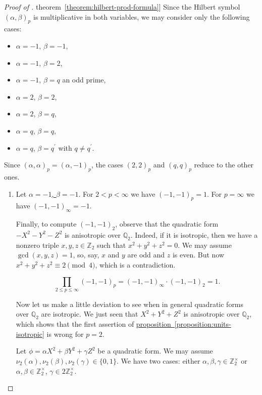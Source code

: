 \documentclass{article}
\newcommand{\ZZ}{\mathbb{Z}}
\newcommand{\QQ}{\mathbb{Q}}
\newcommand{\refref}[2]{\hyperref[#2]{#1~\ref*{#2}}}
\theoremstyle{myplain}
\theoremstyle{mydefinition}
\begin{document}
\begin{proof}[Proof of \refref{theorem}{theorem:hilbert-prod-formula}]
  Since the Hilbert symbol $(\alpha,\beta)_p$ is multiplicative in both
  variables, we may consider only the following cases:
  \begin{itemize}
  \item $\alpha = -1$, $\beta = -1$,
  \item $\alpha = -1$, $\beta = 2$,
  \item $\alpha = -1$, $\beta = q$ an odd prime,
  \item $\alpha = 2$, $\beta = 2$,
  \item $\alpha = 2$, $\beta = q$,
  \item $\alpha = q$, $\beta = q$,
  \item $\alpha = q$, $\beta = q^\prime$ with $q \ne q^\prime$.
  \end{itemize}

  Since $(\alpha,\alpha)_p = (\alpha,-1)_p$, the cases $(2,2)_p$ and $(q,q)_p$
  reduce to the other ones.

  \begin{enumerate}
  \item Let \underline{$\alpha = -1$, $\beta = -1$}. For $2 < p < \infty$ we
    have $(-1,-1)_p = 1$. For $p = \infty$ we have $(-1,-1)_\infty = -1$.

    \label{x2y2z2-anisotropic-over-q2} Finally, to compute $(-1,-1)_2$, observe
    that the quadratic form $-X^2 - Y^2 - Z^2$ is anisotropic over
    $\QQ_2$. Indeed, if it is isotropic, then we have a nonzero triple
    $x,y,z \in \ZZ_2$ such that $x^2 + y^2 + z^2 = 0$. We may assume
    $\gcd (x,y,z) = 1$, so, say, $x$ and $y$ are odd and $z$ is even. But now
    $x^2 + y^2 + z^2 \equiv 2 \pmod{4}$, which is a contradiction.

    \[ \prod_{2 \le p \le \infty} (-1,-1)_p = (-1,-1)_\infty \cdot (-1,-1)_2 = 1. \]

    \vspace{1em}

    Now let us make a little deviation to see when in general quadratic forms
    over $\QQ_2$ are isotropic. We just seen that $X^2 + Y^2 + Z^2$ is
    anisotropic over $\QQ_2$, which shows that the first assertion of
    \refref{proposition}{proposition:units-isotropic} is wrong for $p = 2$.

    \vspace{1em}

    \label{isotropic-over-Q2}
    Let $\phi = \alpha X^2 + \beta Y^2 + \gamma Z^2$ be a quadratic form. We may
    assume $\nu_2 (\alpha), \nu_2 (\beta), \nu_2 (\gamma) \in \{ 0,1 \}$. We
    have two cases: either $\alpha,\beta,\gamma \in \ZZ_2^\times$ or
    $\alpha,\beta \in \ZZ_2^\times$, $\gamma \in 2 \ZZ_2^\times$.


\end{enumerate}
\end{proof}
\end{document}
